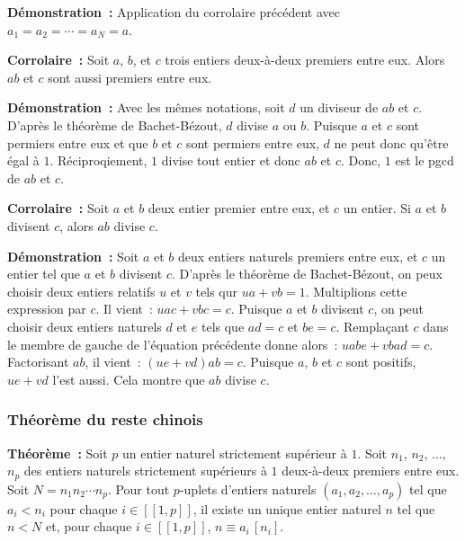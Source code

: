 \medskip

\noindent\textbf{Démonstration :} 
Application du corrolaire précédent avec $a_1 = a_2 = \cdots = a_N = a$.

\done

\medskip

\noindent\textbf{Corrolaire :} Soit $a$, $b$, et $c$ trois entiers deux-à-deux premiers entre eux. Alors $ab$ et $c$ sont aussi premiers entre eux.

\medskip 

\noindent\textbf{Démonstration :} Avec les mêmes notations, soit $d$ un diviseur de $ab$ et $c$. D'après le théorème de Bachet-Bézout, $d$ divise $a$ ou $b$. 
Puisque $a$ et $c$ sont permiers entre eux et que $b$ et $c$ sont permiers entre eux, $d$ ne peut donc qu'être égal à $1$. 
Réciproqiement, $1$ divise tout entier et donc $ab$ et $c$.
Donc, $1$ est le pgcd de $ab$ et $c$.

\done

\medskip 

\noindent\textbf{Corrolaire :} Soit $a$ et $b$ deux entier premier entre eux, et $c$ un entier. Si $a$ et $b$ divisent $c$, alors $ab$ divise $c$.

\medskip

\noindent\textbf{Démonstration :} 
    Soit $a$ et $b$ deux entiers naturels premiers entre eux, et $c$ un entier tel que $a$ et $b$ divisent $c$.
    D'après le théorème de Bachet-Bézout, on peux choisir deux entiers relatifs $u$ et $v$ tels qur $u a + v b = 1$. 
    Multiplions cette expression par $c$. Il vient : $u a c + v b c = c$. 
    Puisque $a$ et $b$ divisent $c$, on peut choisir deux entiers naturels $d$ et $e$ tels que $a d = c$ et $b e = c$. 
    Remplaçant $c$ dans le membre de gauche de l'équation précédente donne alors : $u a b e + v b a d = c$. 
    Factorisant $a b$, il vient : $(u e + v d) a b = c$. 
    Puisque $a$, $b$ et $c$ sont positifs, $u e + v d$ l'est aussi. 
    Cela montre que $a b$ divise $c$. 

\done

\subsubsection{Théorème du reste chinois}

\medskip

\noindent\textbf{Théorème :} Soit $p$ un entier naturel strictement supérieur à $1$. Soit $n_1$, $n_2$, ..., $n_p$ des entiers naturels strictement supérieurs à $1$ deux-à-deux premiers entre eux. 
Soit $N = n_1 n_2 \cdots n_p$. 
Pour tout $p$-uplets d'entiers naturels $(a_1, a_2, \dots, a_p)$ tel que $a_i < n_i$ pour chaque $i \in [\![1,p]\!]$, il existe un unique entier naturel $n$ tel que $n < N$ et, pour chaque $i \in [\![1,p]\!]$, $n \equiv a_i \, [n_i]$.

